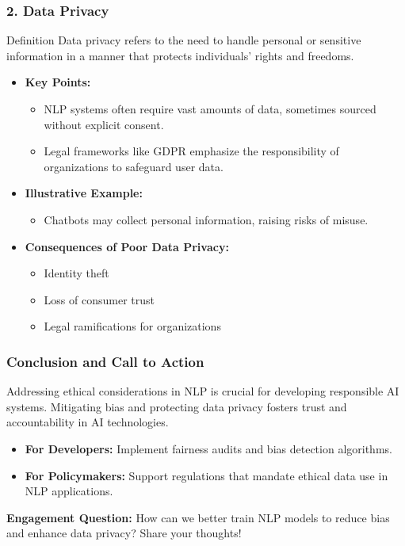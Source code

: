 \documentclass[aspectratio=169]{beamer}
\begin{document}
\begin{frame}[fragile]
    \frametitle{2. Data Privacy}
    \begin{block}{Definition}
        Data privacy refers to the need to handle personal or sensitive information in a manner that protects individuals’ rights and freedoms.
    \end{block}

    \begin{itemize}
        \item \textbf{Key Points:}
            \begin{itemize}
                \item NLP systems often require vast amounts of data, sometimes sourced without explicit consent.
                \item Legal frameworks like GDPR emphasize the responsibility of organizations to safeguard user data.
            \end{itemize}
        
        \item \textbf{Illustrative Example:}
            \begin{itemize}
                \item Chatbots may collect personal information, raising risks of misuse.
            \end{itemize}
        
        \item \textbf{Consequences of Poor Data Privacy:}
            \begin{itemize}
                \item Identity theft
                \item Loss of consumer trust
                \item Legal ramifications for organizations
            \end{itemize}
    \end{itemize}
\end{frame}

\begin{frame}[fragile]
    \frametitle{Conclusion and Call to Action}
    Addressing ethical considerations in NLP is crucial for developing responsible AI systems. Mitigating bias and protecting data privacy fosters trust and accountability in AI technologies.

    \begin{itemize}
        \item \textbf{For Developers:} Implement fairness audits and bias detection algorithms.
        \item \textbf{For Policymakers:} Support regulations that mandate ethical data use in NLP applications.
    \end{itemize}

    \textbf{Engagement Question:} How can we better train NLP models to reduce bias and enhance data privacy? Share your thoughts!
\end{frame}
\end{document}
